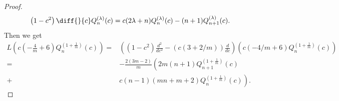 \documentclass[review,nopreprintline]{elsarticle}
\theoremstyle{definition}
\numberwithin{equation}{section}
\theoremstyle{remark}
\begin{document}
\begin{proof}
	        \begin{equation}
	            \left(1-c^2\right) \diff{}{c}Q_n^{(\lambda )}(c)=c (2 \lambda +n) Q_n^{(\lambda )}(c)-(n+1) Q_{n+1}^{(\lambda )}(c).
	        \end{equation}
	        Then we get
	        \begin{align*}
	            L \left(c(-\frac{4}{m}+6) Q_n^{\left(1+\frac{1}{m}\right)}(c)\right)=&\left( (1-c^2)\frac{d^2}{dc^2}-(c(3+2/m))\frac{d}{dc} \right)\left(c(-4/m+6) Q_n^{\left(1+\frac{1}{m}\right)}(c)\right)\\
	            =&-\frac{2 (3 m-2)}{m} \left(2 m (n+1) Q_{n+1}^{\left(1+\frac{1}{m}\right)}(c)\right.
	            \\+&\left. c (n-1) (m n+m+2) Q_n^{\left(1+\frac{1}{m}\right)}(c)\right).
	        \end{align*}
	       

\end{proof}
\end{document}
